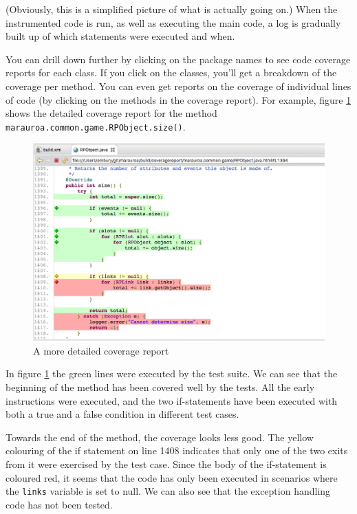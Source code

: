 \documentclass[
]{book}
\begin{document}
(Obviously, this is a simplified picture of what is actually going on.) When the instrumented code is run, as well as executing the main code, a log is gradually built up of which statements were executed and when.

You can drill down further by clicking on the package names to see code coverage reports for each class. If you click on the classes, you'll get a breakdown of the coverage per method. You can even get reports on the coverage of individual lines of code (by clicking on the methods in the coverage report). For example, figure \ref{fig:showDetailedMethodCoverageReportMac-fig} shows the detailed coverage report for the method \texttt{marauroa.common.game.RPObject.size()}.

\begin{figure}

{\centering \includegraphics[width=1\linewidth]{images/3.3.8showDetailedMethodCoverageReportMac} 

}

\caption{A more detailed coverage report}\label{fig:showDetailedMethodCoverageReportMac-fig}
\end{figure}

In figure \ref{fig:showDetailedMethodCoverageReportMac-fig} the green lines were executed by the test suite. We can see that the beginning of the method has been covered well by the tests. All the early instructions were executed, and the two if-statements have been executed with both a true and a false condition in different test cases.

Towards the end of the method, the coverage looks less good. The yellow colouring of the if statement on line 1408 indicates that only one of the two exits from it were exercised by the test case. Since the body of the if-statement is coloured red, it seems that the code has only been executed in scenarios where the \texttt{links} variable is set to null. We can also see that the exception handling code has not been tested.
\end{document}

